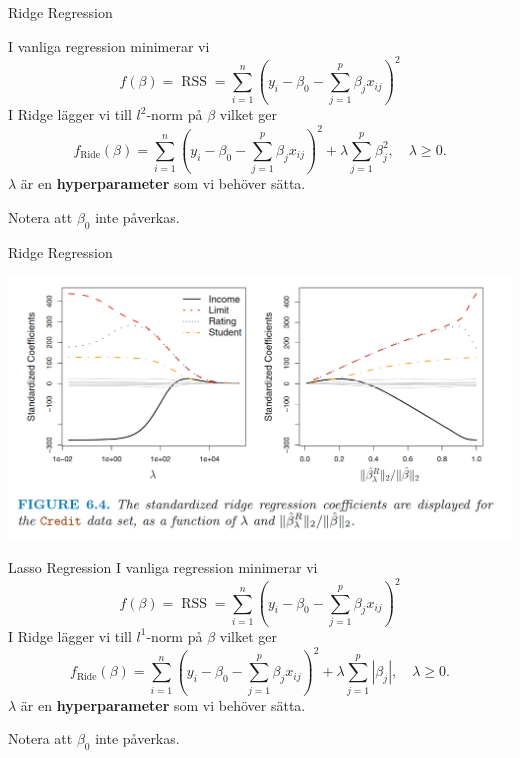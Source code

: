 \documentclass[10pt,english]{beamer}
\begin{document}
\begin{frame}{Ridge Regression}

    I vanliga regression minimerar vi
    \begin{equation*}
        f(\beta) = \operatorname{RSS} = \sum_{i=1}^{n}\left(y_i - \beta_0 - \sum_{j=1}^{p}\beta_j x_{ij}\right)^2
    \end{equation*}
    I Ridge lägger vi till $l^2$-norm på $\beta$ vilket ger
    \begin{equation*}
        f_{\text{Ride}}(\beta) = \sum_{i=1}^{n}\left(y_i - \beta_0 - \sum_{j=1}^{p}\beta_j x_{ij}\right)^2 + \lambda \sum_{j=1}^{p} \beta_j^2, \quad \lambda \geq 0.
    \end{equation*}
    $\lambda$ är en \textbf{hyperparameter} som vi behöver sätta.

    Notera att $\beta_0$ inte påverkas.
    
\end{frame}

\begin{frame}{Ridge Regression}

    \includegraphics[width=\textwidth]{figs/standardized ridge regression coefficients.png}
    
\end{frame}

\begin{frame}{Lasso Regression}
    I vanliga regression minimerar vi
    \begin{equation*}
        f(\beta) = \operatorname{RSS} = \sum_{i=1}^{n}\left(y_i - \beta_0 - \sum_{j=1}^{p}\beta_j x_{ij}\right)^2
    \end{equation*}
    I Ridge lägger vi till $l^1$-norm på $\beta$ vilket ger
    \begin{equation*}
        f_{\text{Ride}}(\beta) = \sum_{i=1}^{n}\left(y_i - \beta_0 - \sum_{j=1}^{p}\beta_j x_{ij}\right)^2 + \lambda \sum_{j=1}^{p} |\beta_j|, \quad \lambda \geq 0.
    \end{equation*}
    $\lambda$ är en \textbf{hyperparameter} som vi behöver sätta.

    Notera att $\beta_0$ inte påverkas.
\end{frame}
\end{document}

